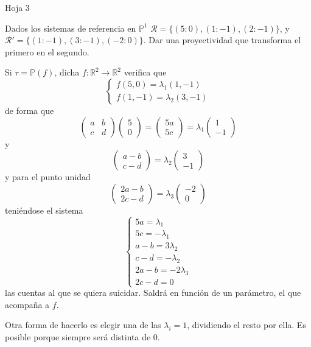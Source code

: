 Hoja 3
\begin{ejer}
    [2] Dados los sistemas de referencia en $\mathbb P^1$ $\mathcal R = \{ (5: 0), (1: -1), (2: -1)\}$, y $\mathcal R' = \{ (1: -1), (3: -1), (-2: 0)\}$. Dar una proyectividad que transforma el primero en el segundo.
\end{ejer}
\begin{sol}
    Si $\tau = \mathbb P(f)$, dicha $f: \mathbb R^2 \to \mathbb R^2$ verifica que
    $$\begin{cases}
        f(5,0) = \lambda_1(1,-1) \\ f(1,-1) = \lambda_2(3,-1)
    \end{cases}$$
    de forma que 
    $$\begin{pmatrix}
        a &b\\c&d
    \end{pmatrix}\begin{pmatrix}
        5\\0
    \end{pmatrix}=\begin{pmatrix}
        5a\\5c
    \end{pmatrix} = \lambda_1\begin{pmatrix}
        1\\-1
    \end{pmatrix}$$
    y 
    $$\begin{pmatrix}
        a-b\\c-d
    \end{pmatrix}=\lambda_2 \begin{pmatrix}
        3\\-1
    \end{pmatrix}$$
    y para el punto unidad
    $$\begin{pmatrix}
        2a-b\\2c-d
    \end{pmatrix}=\lambda_3 \begin{pmatrix}
        -2 \\ 0
    \end{pmatrix}$$
    teni\'endose el sistema
    $$\begin{cases}
        5a = \lambda_1 \\ 5c=-\lambda_1 \\ a-b=3\lambda_2 \\ c-d=-\lambda_2 \\ 2a-b=-2\lambda_3 \\ 2c-d=0
    \end{cases}$$
    las cuentas al que se quiera suicidar. Saldr\'a en funci\'on de un par\'ametro, el que acompaña a $f$.

    Otra forma de hacerlo es elegir una de las $\lambda_i = 1$, dividiendo el resto por ella. Es posible porque siempre ser\'a distinta de 0.
\end{sol}
